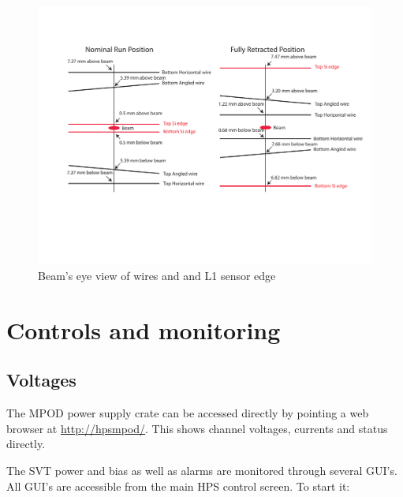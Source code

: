 \documentclass[12pt]{report}
\begin{document}
\begin{figure}[ht!]
\centering
\includegraphics[width=15cm]{WireFrame2.pdf}
\caption{Beam's eye view of wires and and L1 sensor edge}
\label{fig:beam}
\end{figure}




\chapter{Controls and monitoring}

\section{Voltages}
\label{sec:monitoring_power}
The MPOD power supply crate can be accessed directly by pointing a web browser at \url{http://hpsmpod/}. This shows channel voltages, currents and status directly.

The SVT power and bias as well as alarms are monitored through several GUI's. All GUI's are accessible from the main HPS control screen. To start it:
\end{document}
